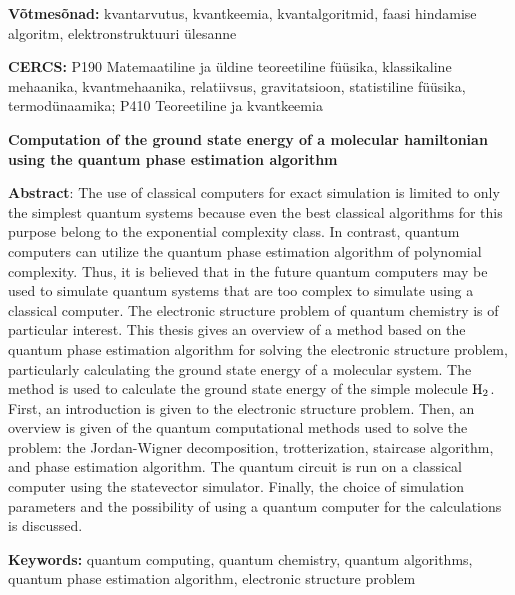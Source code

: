 \documentclass[12pt]{report}
\begin{document}
\vspace*{1ex}

\noindent\textbf{Võtmesõnad:}
kvantarvutus, kvantkeemia, kvantalgoritmid, faasi hindamise algoritm, elektronstruktuuri ülesanne

\vspace*{1ex}

\noindent\textbf{CERCS:}
P190 Matemaatiline ja üldine teoreetiline füüsika, klassikaline mehaanika, kvantmehaanika, relatiivsus, gravitatsioon, statistiline füüsika, termodünaamika;
P410 Teoreetiline ja kvantkeemia

\vspace*{5ex}

\noindent\textbf{\large Computation of the ground state energy of a molecular hamiltonian using the quantum phase estimation algorithm}

\vspace*{1ex}

\noindent\textbf{Abstract}:
The use of classical computers for exact simulation is limited to only the simplest quantum systems because even the best classical algorithms for this purpose belong to the exponential complexity class.
In contrast, quantum computers can utilize the quantum phase estimation algorithm of polynomial complexity.
Thus, it is believed that in the future quantum computers may be used to simulate quantum systems that are too complex to simulate using a classical computer.
The electronic structure problem of quantum chemistry is of particular interest.
This thesis gives an overview of a method based on the quantum phase estimation algorithm for solving the electronic structure problem, particularly calculating the ground state energy of a molecular system.
The method is used to calculate the ground state energy of the simple molecule \(\rm H_2\).
First, an introduction is given to the electronic structure problem.
Then, an overview is given of the quantum computational methods used to solve the problem: the Jordan-Wigner decomposition, trotterization, staircase algorithm, and phase estimation algorithm.
The quantum circuit is run on a classical computer using the statevector simulator.
Finally, the choice of simulation parameters and the possibility of using a quantum computer for the calculations is discussed.

\noindent\textbf{Keywords:}
quantum computing, quantum chemistry, quantum algorithms, quantum phase estimation algorithm, electronic structure problem

\vspace*{1ex}
\end{document}
